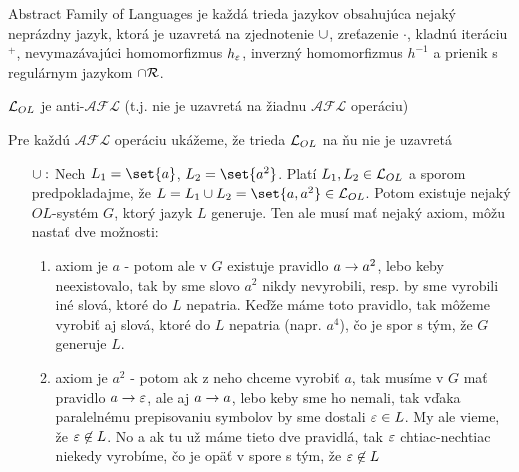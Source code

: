 
\begin{definicia}
  Abstract Family of Languages je každá trieda
  jazykov obsahujúca nejaký neprázdny jazyk, ktorá je uzavretá na
  zjednotenie $\cup$, zreťazenie $\cdot$, kladnú iteráciu $^+$,
  nevymazávajúci homomorfizmus $h_{\varepsilon}$,
  inverzný homomorfizmus $h^{-1}$ a prienik s regulárnym jazykom
  $\cap \mathcal{R}$.
\end{definicia}

\begin{veta}
  $\mathcal{L}_{OL}$ je anti-$\mathcal{AFL}$ (t.j. nie je uzavretá
  na žiadnu $\mathcal{AFL}$ operáciu)
\end{veta}

\begin{dokaz}
    Pre každú $\mathcal{AFL}$ operáciu ukážeme, že trieda
    $\mathcal{L}_{OL}$ na ňu nie je uzavretá

    \begin{itemize}
    \item[$\cup:$] Nech $L_1 = \set{a}$, $L_2=\set{a^2}$.
        Platí $L_1,L_2 \in \mathcal{L}_{OL}$ a sporom
        predpokladajme, že $L=L_1 \union L_2 = \set{a, a^2}\in \Langclass{OL}$.
        Potom existuje nejaký $OL$-systém $G$, ktorý jazyk $L$
        generuje. Ten ale musí mať nejaký axiom, môžu nastať dve možnosti:
        \begin{enumerate}
        \item axiom je $a$ - potom ale v $G$ existuje pravidlo 
            $a\rightarrow a^2$,
            lebo keby neexistovalo, tak by sme slovo $a^2$ nikdy
            nevyrobili, resp. by sme vyrobili iné slová, ktoré do $L$
            nepatria. Keďže máme toto pravidlo, tak môžeme vyrobiť aj slová,
            ktoré do $L$ nepatria (napr. $a^4$), čo je spor s tým, že
            $G$ generuje $L$.

        \item axiom je $a^2$ - potom ak z neho chceme vyrobiť $a$, tak
            musíme v $G$ mať pravidlo $a \rightarrow \varepsilon$,
            ale aj $a \rightarrow a$, lebo
            keby sme ho nemali, tak vďaka paralelnému prepisovaniu symbolov by
            sme dostali $\varepsilon \in L$. My ale vieme, že
            $\varepsilon \not\in L$. No a ak tu už máme tieto dve pravidlá, tak
            $\varepsilon$ chtiac-nechtiac niekedy vyrobíme, čo je opäť v spore
            s tým, že $\varepsilon \not\in L$
        \end{enumerate}


\end{itemize}
\end{dokaz}
